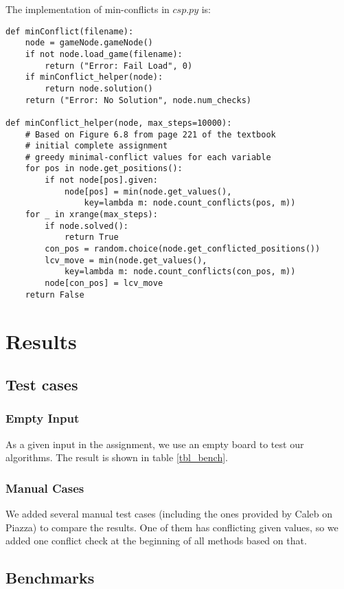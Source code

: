 \documentclass[11pt]{article}
\begin{document}
The implementation of min-conflicts in $csp.py$ is:

\lstset{language=Python}
\begin{lstlisting}[frame=single]
def minConflict(filename):
	node = gameNode.gameNode()
	if not node.load_game(filename):
		return ("Error: Fail Load", 0)
	if minConflict_helper(node):
		return node.solution()
	return ("Error: No Solution", node.num_checks)

def minConflict_helper(node, max_steps=10000):
	# Based on Figure 6.8 from page 221 of the textbook
	# initial complete assignment
	# greedy minimal-conflict values for each variable
	for pos in node.get_positions():
		if not node[pos].given:
			node[pos] = min(node.get_values(),
				key=lambda m: node.count_conflicts(pos, m))
	for _ in xrange(max_steps):
		if node.solved():
			return True
		con_pos = random.choice(node.get_conflicted_positions())
		lcv_move = min(node.get_values(),
			key=lambda m: node.count_conflicts(con_pos, m))
		node[con_pos] = lcv_move
	return False
\end{lstlisting}

\section{Results}

\subsection{Test cases}

\subsubsection{Empty Input}

As a given input in the assignment, we use an empty board to test our algorithms.
The result is shown in table \ref{tbl_bench}.

\subsubsection{Manual Cases}

We added several manual test cases (including the ones provided by Caleb on
Piazza) to compare the results. One of them has conflicting given values, so we
added one conflict check at the beginning of all methods based on that.

\subsection{Benchmarks}
\end{document}
